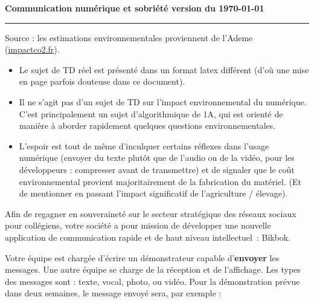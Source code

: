 
\begin{center}
  \Large\bf Communication numérique et sobriété \ifclimasup version du \today\fi
\end{center}

\noindent\rule{\linewidth}{.6pt}

\bigskip

Source : les estimations environnementales proviennent de l'Ademe (\url{impactco2.fr}).

\ifclimasup
{}
\begin{itemize}
\item Le sujet de TD réel est présenté dans un format latex différent (d'où une mise en page parfois douteuse dans ce document).
\item Il ne s'agit pas d'un sujet de TD sur l'impact environnemental du numérique. C'est principalement un sujet d'algorithmique de 1A, qui est orienté de manière à aborder rapidement quelques questions environnementales.
\item L'espoir est tout de même d'inculquer certains réflexes dans l'usage numérique (envoyer du texte plutôt que de l'audio ou de la vidéo, pour les développeurs : compresser avant de transmettre)
et de signaler que le coût environnemental provient majoritairement de la fabrication du matériel. (Et de mentionner en passant l'impact significatif de l'agriculture / élevage).
\end{itemize}
\fi


Afin de regagner en souveraineté sur le secteur stratégique des réseaux sociaux pour collégiens, votre société a pour mission de développer une nouvelle application de communication rapide et
de haut niveau intellectuel~: Bikbok.
\medskip

Votre équipe est chargée d'écrire un démonstrateur capable d'\textbf{envoyer} les messages. Une autre équipe se charge de la réception et de l'affichage. Les types des messages sont :
texte, vocal, photo, ou vidéo.
Pour la démonstration prévue dans deux semaines, le message envoyé sera, par exemple :

\medskip
\centerline{}
\medskip

